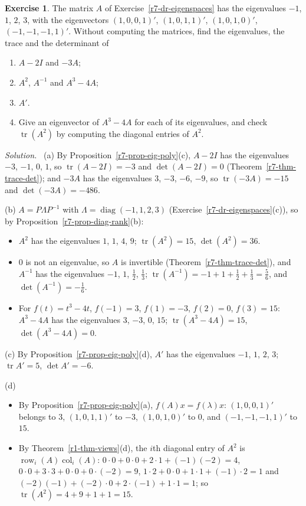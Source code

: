 \documentclass[12pt]{article}
\DeclareMathOperator{\tr}{tr}
\DeclareMathOperator{\row}{row}
\DeclareMathOperator{\col}{col}
\DeclareMathOperator{\diag}{diag}
\theoremstyle{definition}
\newtheorem{exercise}{Exercise}
\newenvironment{solution}{\par\noindent\textit{Solution.}\ }{\par\smallskip}
\begin{document}
\begin{exercise}\label{r7-dr-related}
The matrix \(A\) of Exercise~\ref{r7-dr-eigenspaces} has the eigenvalues \(-1\), \(1\), \(2\), \(3\), with the eigenvectors
\((1,0,0,1)'\), \((1,0,1,1)'\), \((1,0,1,0)'\), \((-1,-1,-1,1)'\). Without computing the matrices, find the eigenvalues, the
trace and the determinant of
\begin{enumerate}
\item \(A-2I\) and \(-3A\);
\item \(A^2\), \(A^{-1}\) and \(A^3-4A\);
\item \(A'\).
\item Give an eigenvector of \(A^3-4A\) for each of its eigenvalues, and check \(\tr(A^2)\) by computing the diagonal
entries of \(A^2\).
\end{enumerate}
\end{exercise}
\begin{solution}
(a) By Proposition~\ref{r7-prop-eig-poly}(c), \(A-2I\) has the eigenvalues \(-3\), \(-1\), \(0\), \(1\), so
\(\tr(A-2I)=-3\) and \(\det(A-2I)=0\) (Theorem~\ref{r7-thm-trace-det}); and \(-3A\) has the eigenvalues \(3\), \(-3\),
\(-6\), \(-9\), so \(\tr(-3A)=-15\) and \(\det(-3A)=-486\).

(b) \(A=P\Lambda P^{-1}\) with \(\Lambda=\diag(-1,1,2,3)\) (Exercise~\ref{r7-dr-eigenspaces}(c)), so by
Proposition~\ref{r7-prop-diag-rank}(b):
\begin{itemize}
\item \(A^2\) has the eigenvalues \(1\), \(1\), \(4\), \(9\); \(\tr(A^2)=15\), \(\det(A^2)=36\).
\item \(0\) is not an eigenvalue, so \(A\) is invertible (Theorem~\ref{r7-thm-trace-det}), and \(A^{-1}\) has the
eigenvalues \(-1\), \(1\), \(\frac12\), \(\frac13\); \(\tr(A^{-1})=-1+1+\frac12+\frac13=\frac56\), and
\(\det(A^{-1})=-\frac16\).
\item For \(f(t)=t^3-4t\), \(f(-1)=3\), \(f(1)=-3\), \(f(2)=0\), \(f(3)=15\): \(A^3-4A\) has the eigenvalues \(3\),
\(-3\), \(0\), \(15\); \(\tr(A^3-4A)=15\), \(\det(A^3-4A)=0\).
\end{itemize}
(c) By Proposition~\ref{r7-prop-eig-poly}(d), \(A'\) has the eigenvalues \(-1\), \(1\), \(2\), \(3\); \(\tr A'=5\),
\(\det A'=-6\).

(d)
\begin{itemize}
\item By Proposition~\ref{r7-prop-eig-poly}(a), \(f(A)x=f(\lambda)x\): \((1,0,0,1)'\) belongs to \(3\), \((1,0,1,1)'\) to
\(-3\), \((1,0,1,0)'\) to \(0\), and \((-1,-1,-1,1)'\) to \(15\).
\item By Theorem~\ref{r1-thm-views}(d), the \(i\)th diagonal entry of \(A^2\) is \(\row_i(A)\col_i(A)\):
\(0\cdot0+0\cdot0+2\cdot1+(-1)(-2)=4\), \(0\cdot0+3\cdot3+0\cdot0+0\cdot(-2)=9\), \(1\cdot2+0\cdot0+1\cdot1+(-1)\cdot2=1\)
and \((-2)(-1)+(-2)\cdot0+2\cdot(-1)+1\cdot1=1\); so \(\tr(A^2)=4+9+1+1=15\).
\end{itemize}
\end{solution}
\end{document}
